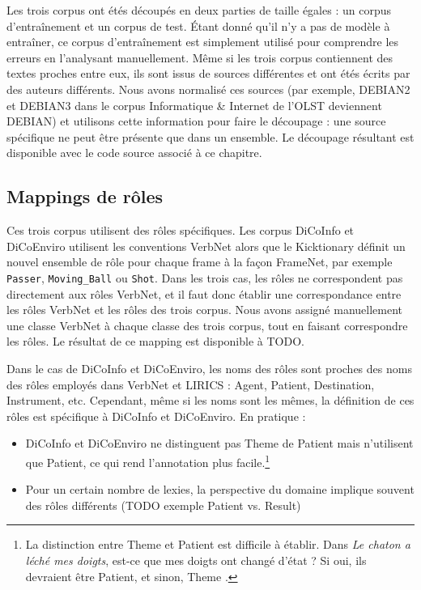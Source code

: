 Les trois corpus ont étés découpés en deux parties de taille égales : un corpus
d'entraînement et un corpus de test. Étant donné qu'il n'y a pas de modèle à
entraîner, ce corpus d'entraînement est simplement utilisé pour comprendre les
erreurs en l'analysant manuellement. Même si les trois corpus contiennent des
textes proches entre eux, ils sont issus de sources différentes et ont étés
écrits par des auteurs différents. Nous avons normalisé ces sources (par
exemple, DEBIAN2 et DEBIAN3 dans le corpus Informatique \& Internet de l'OLST
deviennent DEBIAN) et utilisons cette information pour faire le découpage : une
source spécifique ne peut être présente que dans un ensemble. Le découpage
résultant est disponible avec le code source associé à ce chapitre.

\subsection{Mappings de rôles}

Ces trois corpus utilisent des rôles spécifiques. Les corpus DiCoInfo et
DiCoEnviro utilisent les conventions VerbNet alors que le Kicktionary  définit
un nouvel ensemble de rôle pour chaque frame à la façon FrameNet, par exemple
\texttt{Passer}, \texttt{Moving\_Ball} ou \texttt{Shot}. Dans les trois cas,
les rôles ne correspondent pas directement aux rôles VerbNet, et il faut donc
établir une correspondance entre les rôles VerbNet et les rôles des trois
corpus.  Nous avons assigné manuellement une classe VerbNet à chaque classe des
trois corpus, tout en faisant correspondre les rôles. Le résultat de ce mapping
est disponible à TODO.

Dans le cas de DiCoInfo et DiCoEnviro, les noms des rôles sont proches des noms
des rôles employés dans VerbNet et LIRICS \citep{bonial2011hierarchical} :
Agent, Patient, Destination, Instrument, etc. Cependant, même si les noms sont
les mêmes, la définition de ces rôles est spécifique à DiCoInfo et DiCoEnviro.
En pratique :

\begin{itemize}

    \item DiCoInfo et DiCoEnviro ne distinguent pas Theme de Patient mais
        n'utilisent que Patient, ce qui rend l'annotation plus
        facile.\footnote{La distinction entre Theme et Patient est difficile à
            établir. Dans \textit{Le chaton a léché mes doigts}, est-ce que mes
            doigts ont changé d'état ? Si oui, ils devraient être Patient, et
        sinon, Theme \citep[p.~5]{palmer2010semantic}.}

    \item Pour un certain nombre de lexies, la perspective du domaine implique
        souvent des rôles différents (TODO exemple Patient vs. Result)
        

\end{itemize}

